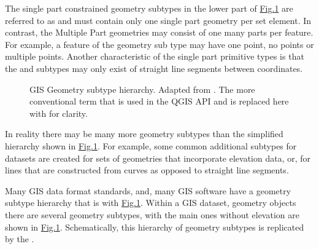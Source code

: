 \documentclass[letterpaper,10pt,english]{sphinxmanual}
\begin{document}
The single part constrained geometry subtypes in the lower part of \hyperref[\detokenize{concept:figuregeomtypei}]{Fig.\@ \ref{\detokenize{concept:figuregeomtypei}}} are referred to as  and must contain only one single part geometry per set element.  In contrast, the Multiple Part geometries may consist of one  many parts per feature.  For example, a feature of the  geometry sub type may have one point, no points or multiple points. Another characteristic of the single part primitive types is that the  and  subtypes may only exist of straight line segments between coordinates.

\begin{figure}[htbp]
\centering
\capstart

\noindent{}
\caption{GIS Geometry subtype hierarchy.  Adapted from .  The more conventional term  that is used in the QGIS API and  is replaced here with  for clarity.}\label{\detokenize{concept:id41}}\label{\detokenize{concept:figuregeomtypei}}\end{figure}

In reality there may be many more geometry subtypes than the simplified hierarchy shown in \hyperref[\detokenize{concept:figuregeomtypei}]{Fig.\@ \ref{\detokenize{concept:figuregeomtypei}}}.  For example, some common additional subtypes for datasets are created for sets of geometries that incorporate elevation data, or, for lines that are constructed from curves as opposed to straight line segments.

Many GIS data format standards, and, many GIS software have a geometry subtype hierarchy that is  with \hyperref[\detokenize{concept:figuregeomtypei}]{Fig.\@ \ref{\detokenize{concept:figuregeomtypei}}}.  Within a GIS dataset, geometry objects there are several geometry subtypes, with the main ones without elevation are shown in \hyperref[\detokenize{concept:figuregeomtypei}]{Fig.\@ \ref{\detokenize{concept:figuregeomtypei}}}.  Schematically, this hierarchy of geometry subtypes is replicated by the  .
\end{document}
